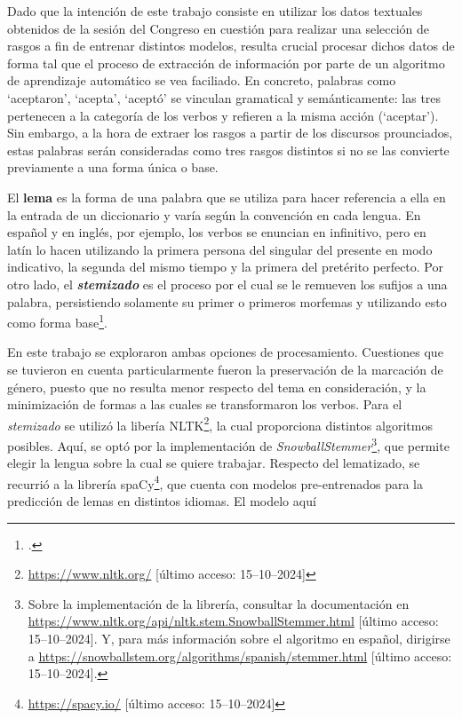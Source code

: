 Dado que la intención de este trabajo consiste en utilizar los datos textuales
obtenidos de la sesión del Congreso en cuestión para realizar una selección
de rasgos a fin de entrenar distintos modelos, resulta crucial procesar dichos
datos de forma tal que el proceso de extracción de información por parte
de un algoritmo de aprendizaje automático se vea faciliado. En concreto, palabras
como `aceptaron', `acepta', `aceptó' se vinculan gramatical y semánticamente:
las tres pertenecen a la categoría de los verbos y refieren a la misma acción (`aceptar').
Sin embargo, a la hora de extraer los rasgos a partir de los discursos prounciados,
estas palabras serán consideradas como tres rasgos distintos si no se las convierte
previamente a una forma única o base.
\par
El \textbf{lema} es la forma de una palabra que se utiliza para hacer referencia a ella
en la entrada de un diccionario y varía según la convención en cada lengua. En español
y en inglés, por ejemplo, los verbos se enuncian en infinitivo, pero en latín lo hacen
utilizando la primera persona del singular del presente en modo indicativo, la segunda
del mismo tiempo y la primera del pretérito perfecto. Por otro lado, el
\textbf{\textit{stemizado}} es el proceso por el cual se le remueven los sufijos
a una palabra, persistiendo solamente su primer o primeros morfemas y utilizando
esto como forma base\footnote{\citet[Capítulo~3]{bird2009natural}.}.
\par
En este trabajo se exploraron ambas opciones de procesamiento. Cuestiones que se tuvieron
en cuenta particularmente fueron la preservación de la marcación de género, puesto que
no resulta menor respecto del tema en consideración, y la minimización de formas a las
cuales se transformaron los verbos. Para el \textit{stemizado} se utilizó la
libería NLTK\footnote{\url{https://www.nltk.org/} [último acceso: 15--10--2024]},
la cual proporciona distintos algoritmos posibles. Aquí, se optó por la
implementación de \textit{SnowballStemmer}\footnote{Sobre la implementación de la
librería, consultar la documentación en
\url{https://www.nltk.org/api/nltk.stem.SnowballStemmer.html}
[último acceso: 15--10--2024]. Y, para más información
sobre el algoritmo en español, dirigirse a
\url{https://snowballstem.org/algorithms/spanish/stemmer.html}
[último acceso: 15--10--2024].}, que permite elegir
la lengua sobre la cual se quiere trabajar. Respecto del lematizado, se recurrió
a la librería spaCy\footnote{\url{https://spacy.io/}
[último acceso: 15--10--2024]}, que cuenta con modelos
pre-entrenados para la predicción de lemas en distintos idiomas. El modelo aquí
